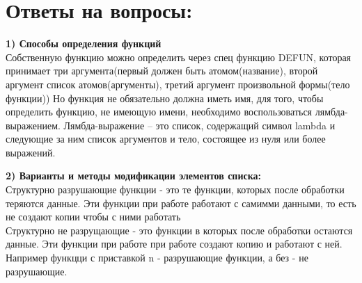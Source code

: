 \documentclass[a4paper, 12pt]{article}
\begin{document}
\section*{Ответы на вопросы:}
\hspace*{-7mm} \textbf{1) Способы определения функций}
\\ Собственную функцию можно определить через спец функцию DEFUN, которая принимает три аргумента(первый должен быть атомом(название), второй аргумент список атомов(аргументы), третий аргумент произвольной формы(тело функции))
Но функция не обязательно должна иметь имя, для того, чтобы определить функцию, не имеющую имени, необходимо воспользоваться лямбда-выражением. Лямбда-выражение – это список, содержащий символ lambda и следующие за ним список аргументов и тело, состоящее из нуля или более выражений.


\hspace*{-13mm} \textbf{2) Варианты и методы модификации элементов списка:}
\\ Структурно разрушающие функции - это те функции, которых после обработки теряются данные. Эти функции при работе работают с самимми данными, то есть не создают копии чтобы с ними работать 
\\Структурно не разрущающие - это функции в которых после обработки остаются данные. Эти функции при работе при работе создают копию и работают с ней.
Например функцци с приставкой n - разрушающие функции, а без - не разрушающие.
\end{document}
